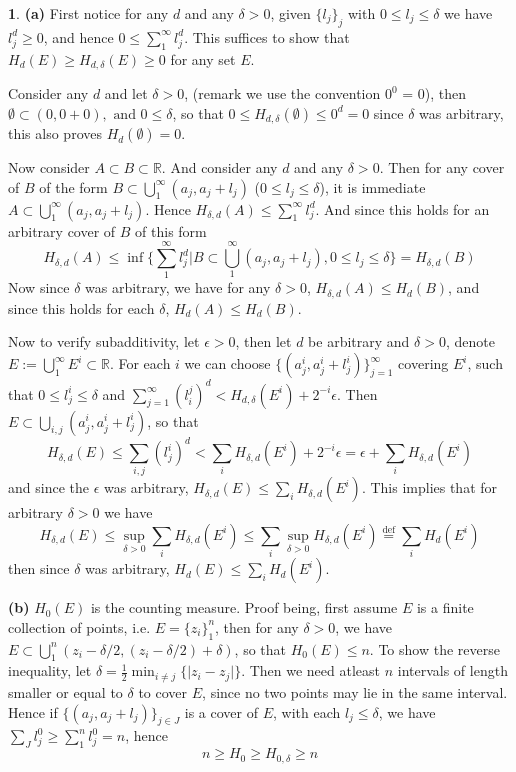 \documentclass[10.5pt]{article}
\theoremstyle{definition}
\newtheorem{pb}{}
\newcommand{\set}[1]{\{#1\}}
\newcommand{\abs}[1]{\lvert#1\rvert}
\newcommand{\tand}{\text{ and }}
\begin{document}
    \begin{pb}
        \textbf{(a)} First notice for any \(d\) and any \(\delta > 0\), given \(\set{l_j}_j\) with \(0 \leq l_j \leq \delta\) we have \(l_j^d \geq 0\), and hence
        \(0 \leq \sum_1^\infty l_j^d\). This suffices to show that \(H_d(E) \geq H_{d,\delta}(E) \geq 0\) for any set \(E\).

        Consider any \(d\) and let \(\delta > 0\), (remark we use the convention \(0^0\) = 0), then \(\emptyset \subset (0,0+0), \tand 0 \leq \delta\), so that \(0 \leq H_{d,\delta}(\emptyset) \leq 0^d = 0\)
        since \(\delta\) was arbitrary, this also proves \(H_{d}(\emptyset) = 0\).

        Now consider \(A \subset B \subset \mathbb{R}\). And consider any \(d\) and any \(\delta > 0\). Then for any cover of \(B\) of the form \(B \subset \bigcup_1^\infty (a_j,a_j + l_j)\) (\(0 \leq l_j \leq \delta\)),
        it is immediate \(A \subset \bigcup_1^\infty (a_j,a_j + l_j)\). Hence \(H_{\delta,d}(A) \leq \sum_1^\infty l_j^d\). And since this holds for an arbitrary cover of \(B\) of this form
        \[H_{\delta,d}(A) \leq \inf\set{\sum_1^\infty l_j^d \vert B \subset \bigcup_1^\infty (a_j,a_j + l_j), 0 \leq l_j \leq \delta} = H_{\delta,d}(B)\]
        Now since \(\delta\) was arbitrary, we have for any \(\delta > 0\), \(H_{\delta,d}(A) \leq H_d(B)\), and since this holds for each \(\delta\), \(H_{d}(A) \leq H_d(B)\).

        Now to verify subadditivity, let \(\epsilon > 0\), then let \(d\) be arbitrary and \(\delta > 0\),
        denote \(E := \bigcup_1^\infty E^i \subset \mathbb{R}\). For each \(i\) we can choose \(\set{(a_j^i,a_j^i + l_j^i)}_{j=1}^\infty\) covering \(E^i\), such that \(0 \leq l_j^i \leq \delta\)
        and \(\sum_{j=1}^\infty (l_i^j)^d < H_{d,\delta}(E^i) + 2^{-i}\epsilon\). Then \(E \subset \bigcup_{i,j}(a_j^i, a_j^i + l_j^i)\), so that
        \[H_{\delta,d}(E) \leq \sum_{i,j}(l_j^i)^d < \sum_i H_{\delta,d}(E^i) + 2^{-i}\epsilon = \epsilon + \sum_i H_{\delta,d}(E^i)\]
        and since the \(\epsilon\) was arbitrary, \(H_{\delta,d}(E) \leq \sum_i H_{\delta,d}(E^i)\). This implies that for arbitrary \(\delta > 0\) we have
        \[H_{\delta,d}(E) \leq \sup_{\delta > 0}\sum_i H_{\delta,d}(E^i) \leq \sum_i \sup_{\delta > 0}H_{\delta,d}(E^i) \overset{\text{def}}{=} \sum_i H_d(E^i)\]
        then since \(\delta\) was arbitrary, \(H_{d}(E) \leq \sum_i H_d(E^i)\).

        \textbf{(b)} \(H_0(E)\) is the counting measure. Proof being, first assume \(E\) is a finite collection of points, i.e. \(E = \set{z_i}_1^n \), then for any \(\delta > 0\), 
        we have \(E \subset \bigcup_1^n (z_i - \delta/2, (z_i - \delta/2) + \delta)\), so that \(H_0(E) \leq n\). To show the reverse inequality, let \(\delta = \frac12 \min_{i \neq j}\set{\abs{z_i - z_j}}\).
        Then we need atleast \(n\) intervals of length smaller or equal to \(\delta\) to cover \(E\), since no two points may lie in the same interval. 
        Hence if \(\set{(a_j, a_j + l_j)}_{j \in J}\) is a cover of \(E\), with each \(l_j \leq \delta\), we have \(\sum_{J} l_j^0  \geq \sum_1^n l_j^0 = n\), hence
        \[n \geq H_0 \geq H_{0,\delta} \geq n\]


\end{pb}
\end{document}
